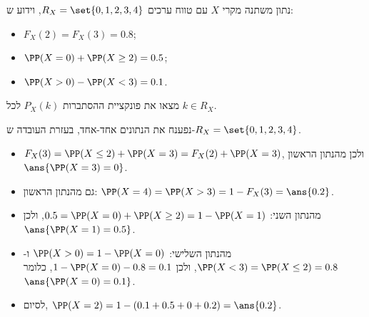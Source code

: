 נתון משתנה מקרי $X$ עם טווח ערכים $R_X=\set{0,1,2,3,4}$, וידוע ש:
\begin{itemize}
\item $F_X(2)=F_X(3)=0.8$;
\item $\PP(X=0)+\PP(X\ge2)=0.5$;
\item $\PP(X>0)-\PP(X<3)=0.1$.
\end{itemize}
מצאו את פונקציית ההסתברות $P_X(k)$ לכל $k\in R_X$.
\begin{solbox}
\unverified
נפענח את הנתונים אחד-אחד, בעזרת העובדה ש-$R_X=\set{0,1,2,3,4}$.
\begin{itemize}
\item $F_X(3)=\PP(X\le2)+\PP(X=3)=F_X(2)+\PP(X=3)$, ולכן מהנתון הראשון $\ans{\PP(X=3)=0}$.
\item גם מהנתון הראשון: $\PP(X=4)=\PP(X>3)=1-F_X(3)=\ans{0.2}$.
\item מהנתון השני: $0.5=\PP(X=0)+\PP(X\ge2)=1-\PP(X=1)$, ולכן $\ans{\PP(X=1)=0.5}$.
\item מהנתון השלישי: $\PP(X>0)=1-\PP(X=0)$ ו-$\PP(X<3)=\PP(X\le2)=0.8$, ולכן $1-\PP(X=0)-0.8=0.1$, כלומר $\ans{\PP(X=0)=0.1}$.
\item לסיום, $\PP(X=2)=1-(0.1+0.5+0+0.2)=\ans{0.2}$.
\end{itemize}
\end{solbox}
